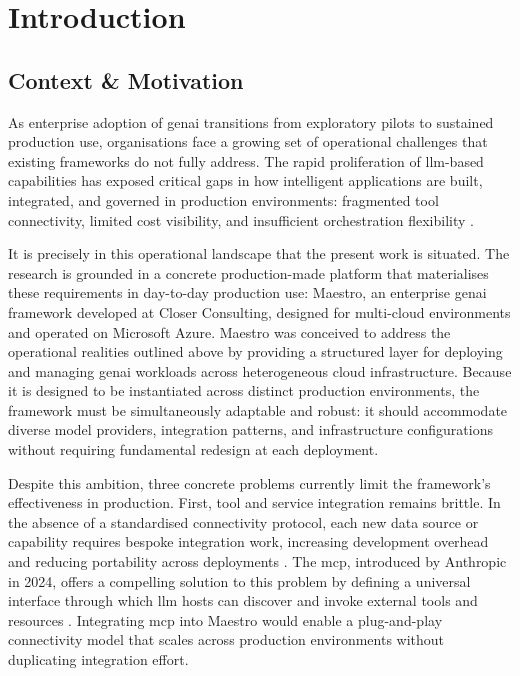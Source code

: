 
%

\chapter{Introduction}
\label{cha:introduction}

\section{Context \& Motivation}
\label{sec:context-motivation}

As enterprise adoption of \acrfull{genai} transitions from exploratory pilots to sustained production use, organisations face a growing set of operational challenges that existing frameworks do not fully address. The rapid proliferation of \acrfull{llm}-based capabilities has exposed critical gaps in how intelligent applications are built, integrated, and governed in production environments: fragmented tool connectivity, limited cost visibility, and insufficient orchestration flexibility \cite{brown2020gpt3}.

It is precisely in this operational landscape that the present work is situated. The research is grounded in a concrete production-made platform that materialises these requirements in day-to-day production use: Maestro, an enterprise \gls{genai} framework developed at Closer Consulting, designed for multi-cloud environments and operated on Microsoft Azure. Maestro was conceived to address the operational realities outlined above by providing a structured layer for deploying and managing \gls{genai} workloads across heterogeneous cloud infrastructure. Because it is designed to be instantiated across distinct production environments, the framework must be simultaneously adaptable and robust: it should accommodate diverse model providers, integration patterns, and infrastructure configurations without requiring fundamental redesign at each deployment.

Despite this ambition, three concrete problems currently limit the framework's effectiveness in production. First, tool and service integration remains brittle. In the absence of a standardised connectivity protocol, each new data source or capability requires bespoke integration work, increasing development overhead and reducing portability across deployments \cite{anthropic2024mcp}. The \acrfull{mcp}, introduced by Anthropic in 2024, offers a compelling solution to this problem by defining a universal interface through which \gls{llm} hosts can discover and invoke external tools and resources \cite{anthropic2024mcp}. Integrating \gls{mcp} into Maestro would enable a plug-and-play connectivity model that scales across production environments without duplicating integration effort.

